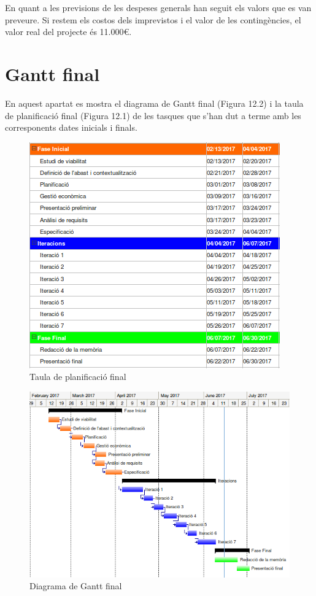 En quant a les previsions de les despeses generals han seguit els valors que es
van preveure. Si restem els costos dels imprevistos i el valor de les contingències, el valor real del projecte és 11.000\euro.

\section{Gantt final}

En aquest apartat es mostra el diagrama de Gantt final (Figura 12.2) i la taula de planificació final (Figura 12.1) de les tasques que s'han dut a terme amb les corresponents dates inicials i finals.

\begin{figure}[!h]
\centering
\includegraphics[scale=1]{Figures/ganttFinal.png}
\caption{Taula de planificació final}
\end{figure}

\begin{figure}[!h]
\centering
\includegraphics[scale=0.85]{Figures/ganttFinal2.png}
\caption{Diagrama de Gantt final}
\end{figure}

